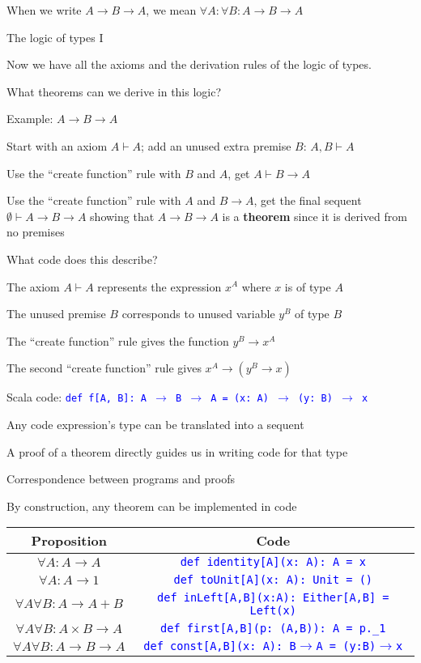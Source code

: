 When we write $A\rightarrow B\rightarrow A$, we mean $\forall A:\forall B:A\rightarrow B\rightarrow A$

The logic of types I

Now we have all the axioms and the derivation rules of the logic of
types.

What theorems can we derive in this logic?

Example: $A\rightarrow B\rightarrow A$

Start with an axiom $A\vdash A$; add an unused extra premise $B$:
$A,B\vdash A$

Use the \textsf{``}create function\textsf{''} rule with $B$ and $A$, get $A\vdash B\rightarrow A$

Use the \textsf{``}create function\textsf{''} rule with $A$ and $B\rightarrow A$,
get the final sequent $\emptyset\vdash A\rightarrow B\rightarrow A$
showing that $A\rightarrow B\rightarrow A$ is a \textbf{theorem}
since it is derived from no premises

What code does this describe?

The axiom $A\vdash A$ represents the expression $x^{A}$ where $x$
is of type $A$

The unused premise $B$ corresponds to unused variable $y^{B}$ of
type $B$

The \textsf{``}create function\textsf{''} rule gives the function $y^{B}\rightarrow x^{A}$

The second \textsf{``}create function\textsf{''} rule gives $x^{A}\rightarrow\left(y^{B}\rightarrow x\right)$

Scala code: \texttt{\textcolor{blue}{\footnotesize{}def f{[}A, B{]}:\ A
$\rightarrow$ B $\rightarrow$ A = (x:\ A) $\rightarrow$ (y:\ B)
$\rightarrow$ x}}{\footnotesize\par}

Any code expression\textsf{'}s type can be translated into a sequent

A proof of a theorem directly guides us in writing code for that type

Correspondence between programs and proofs

By construction, any theorem can be implemented in code
\begin{center}
\begin{tabular}{|c|c|}
\hline 
\textbf{Proposition} & \textbf{Code}\tabularnewline
\hline 
\hline 
$\forall A:A\rightarrow A$ & \texttt{\textcolor{blue}{\footnotesize{}def identity{[}A{]}(x:\ A):\ A
= x}}\tabularnewline
\hline 
$\forall A:A\rightarrow1$ & \texttt{\textcolor{blue}{\footnotesize{}def toUnit{[}A{]}(x:\ A): Unit
= ()}}\tabularnewline
\hline 
$\forall A\forall B:A\rightarrow A+B$ & \texttt{\textcolor{blue}{\footnotesize{}def inLeft{[}A,B{]}(x:A):\ Either{[}A,B{]}
= Left(x)}}\tabularnewline
\hline 
$\forall A\forall B:A\times B\rightarrow A$ & \texttt{\textcolor{blue}{\footnotesize{}def first{[}A,B{]}(p:\ (A,B)):\ A
= p.\_1}}\tabularnewline
\hline 
$\forall A\forall B:A\rightarrow B\rightarrow A$ & \texttt{\textcolor{blue}{\footnotesize{}def const{[}A,B{]}(x:\ A):\ B$\rightarrow$A
= (y:B)$\rightarrow$x}}\tabularnewline
\hline 
\end{tabular}
\par\end{center}

